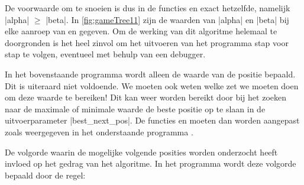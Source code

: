 \begin{cpplstShortInline}

De voorwaarde om te snoeien is dus in de functies  en  exact hetzelfde, namelijk |alpha| $\geq$ |beta|.
In \cref{fig:gameTree11} zijn de waarden van |alpha| en |beta| bij elke aanroep van  en  gegeven.
Om de werking van dit  algoritme helemaal te doorgronden is het heel zinvol om het uitvoeren van het programma  stap voor stap te volgen, eventueel met behulp van een debugger.


In het bovenstaande programma wordt alleen de waarde van de positie bepaald.
Dit is uiteraard niet voldoende.
We moeten ook weten welke zet we moeten doen om deze waarde te bereiken!
Dit kan weer worden bereikt door bij het zoeken naar de maximale of minimale waarde de beste positie op te slaan in de uitvoerparameter |best_next_pos|.
De functies  en  moeten dan worden aangepast zoals weergegeven in het onderstaande programma .


De volgorde waarin de mogelijke volgende posities worden onderzocht heeft invloed op het gedrag van het  algoritme.
In het programma  wordt deze volgorde bepaald door de regel:


\end{cpplstShortInline}
